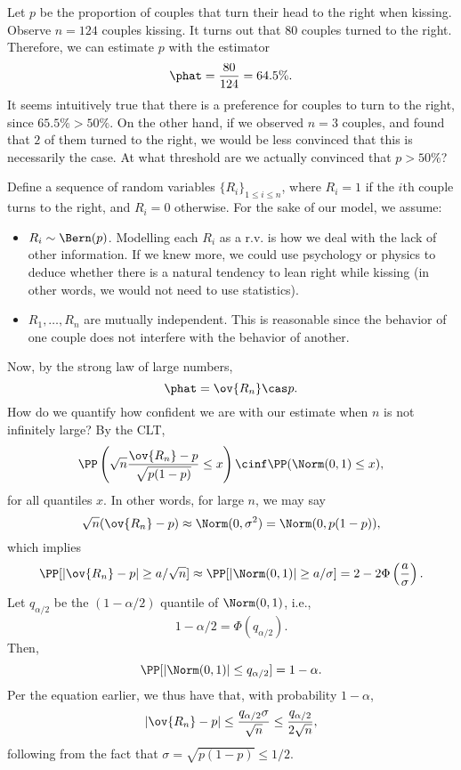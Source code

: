 Let $p$ be the proportion of couples that turn their head to the right when kissing. Observe $n=124$ couples kissing. It turns out that $80$ couples turned to the right. Therefore, we can estimate $p$ with the estimator
\[\phat = \frac{80}{124} = 64.5\%.\]
It seems intuitively true that there is a preference for couples to turn to the right, since $65.5\% > 50\%$. On the other hand, if we observed $n=3$ couples, and found that $2$ of them turned to the right, we would be less convinced that this is necessarily the case. At what threshold are we actually convinced that $p > 50\%$?

\hrulebar

Define a sequence of random variables $\{R_i\}_{1\leq i\leq n}$, where $R_i=1$ if the $i$th couple turns to the right, and $R_i = 0$ otherwise. For the sake of our model, we assume: 
\begin{itemize}
\setlength \itemsep{0cm}
\item $R_i\sim \Bern(p)$. Modelling each $R_i$ as a r.v. is how we deal with the lack of other information. If we knew more, we could use psychology or physics to deduce whether there is a natural tendency to lean right while kissing (in other words, we would not need to use statistics).    
    \item $R_1, \hdots, R_n$ are mutually independent. This is reasonable since the behavior of one couple does not interfere with the behavior of another.
\end{itemize}

Now, by the strong law of large numbers,
\[\phat = \ov{R_n} \cas p.\]
How do we quantify how confident we are with our estimate when $n$ is not infinitely large? By the CLT, 
\[\PP\left(\sqrt{n}\frac{\ov{R_n} - p}{\sqrt{p(1-p)}}\leq x\right) \cinf \PP(\Norm(0,1)\leq x),\]
for all \ac{quantiles} $x$. In other words, for large $n$, we may say 
\[\sqrt{n}(\ov{R_n}-p)\approx \Norm(0, \sigma^2) = \Norm(0, p(1-p)),\]
which implies
\[\PP[\vert \ov{R_n}-p\vert \geq a/\sqrt{n}]\approx \PP[\vert \Norm(0,1)\vert \geq a/\sigma] = 2-2\Phi\left(\frac{a}{\sigma}\right).\]
Let $q_{\alpha/2}$ be the $(1-\alpha/2)$ quantile of $\Norm(0,1)$, i.e.,
\[1-\alpha/2 = \Phi\left(q_{\alpha/2}\right).\]
Then, 
\[\PP[\vert \Norm(0,1)\vert \leq q_{\alpha/2}] = 1-\alpha.\]
Per the equation earlier, we thus have that, with probability $1-\alpha$,
\[\vert \ov{R_n} - p\vert \leq \frac{q_{\alpha/2}\sigma}{\sqrt{n}}\leq \frac{q_{\alpha/2}}{2\sqrt{n}},\]
following from the fact that $\sigma = \sqrt{p(1-p)}\leq 1/2$.

